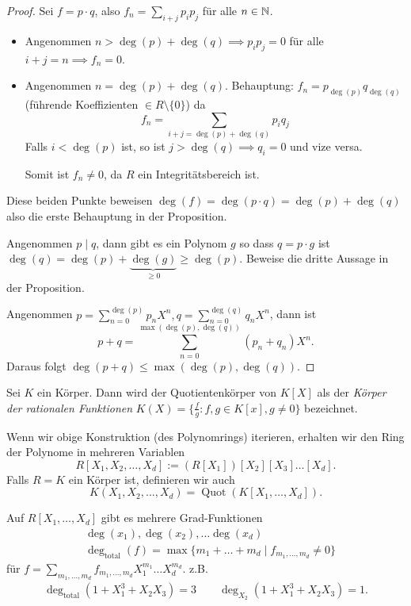 \begin{proof}
	Sei $f = p\cdot q$, also $f_{n} = \sum_{i+j} p_{i} p_{j} $ für alle $n \in \mathbb{N}$.
	\begin{itemize}
		\item Angenommen $n > \deg(p) + \deg(q) \implies p_{i} p_{j} = 0$ für alle $i+j = n \implies f_{n} = 0$.
		\item Angenommen $n = \deg(p) + \deg(q)$. Behauptung: $f_{n} = p_{\deg(p)} q_{\deg(q)}$ (führende Koeffizienten $\in R \setminus \{0\} $) da
			 \[
				 f_{n} = \sum_{i+j = \deg(p) + \deg(q)} p_{i} q_{j}
			\] 
			Falls $i < \deg(p)$ ist, so ist $j > \deg(q) \implies q_{i} = 0$ und vize versa.

			Somit ist $f_{n} \neq 0$, da $R$ ein Integritätsbereich ist.
	\end{itemize}
	Diese beiden Punkte beweisen $\deg(f) = \deg(p\cdot q) = \deg(p) + \deg(q)$ also die erste Behauptung in der Proposition.

	Angenommen $p \mid q$, dann gibt es ein Polynom $g$ so dass $q = p \cdot g$ ist $\deg(q) = \deg(p) + \underbrace{\deg(g)}_{\geq 0} \geq \deg(p)$.
	Beweise die dritte Aussage in der Proposition.

	Angenommen $p = \sum_{n=0}^{\deg(p)} p_{n} X^{n}, q = \sum_{n=0}^{\deg(q)} q_{n} X^{n}$, dann ist
	\[
		p+q = \sum_{n=0}^{\max(\deg(p),\deg(q))} (p_{n} + q_{n}) X^{n}
	.\] 
	Daraus folgt $\deg(p+q) \leq \max(\deg(p), \deg(q))$.
\end{proof}

\begin{definition}
	Sei $K$ ein Körper. Dann wird der Quotientenkörper von $K[X]$ als der \emph{Körper der rationalen Funktionen}
	$K(X) = \{\frac{f}{g} : f,g \in K[x], g \neq 0\} $ bezeichnet.
\end{definition}

Wenn wir obige Konstruktion (des Polynomrings) iterieren, erhalten wir den Ring der Polynome in mehreren Variablen
\[
	R[X_1,X_2,\ldots,X_{d}] := (R[X_1])[X_2][X_3]\ldots[X_{d}]
.\] 
Falls $R = K$ ein Körper ist, definieren wir auch
\[
	K(X_1,X_2,\ldots,X_{d}) = \operatorname{Quot}(K[X_1,\ldots,X_{d}])
.\] 

\begin{remark}
	Auf $R[X_1,\ldots,X_{d}]$ gibt es mehrere Grad-Funktionen
	\begin{align*}
		&\deg(x_1), \deg(x_2), \ldots \deg(x_{d})\\
		&\deg_{\text{total}}(f) = \max \{m_1+\ldots+m_{d} \mid f_{m_1,\ldots,m_{d}} \neq 0\} 
	\end{align*}
	für $f = \sum_{m_1,\ldots,m_{d}} f_{m_1,\ldots,m_{d}} X_1^{m_1}\ldots X_{d}^{m_{d}}$.
	z.B.
	\begin{align*}
		\deg_{\text{total}}(1+X_1^{3} + X_2 X_3) = 3 \qquad \deg_{X_2}(1+X_1^{3} + X_2 X_3) = 1
	.\end{align*}
\end{remark}

